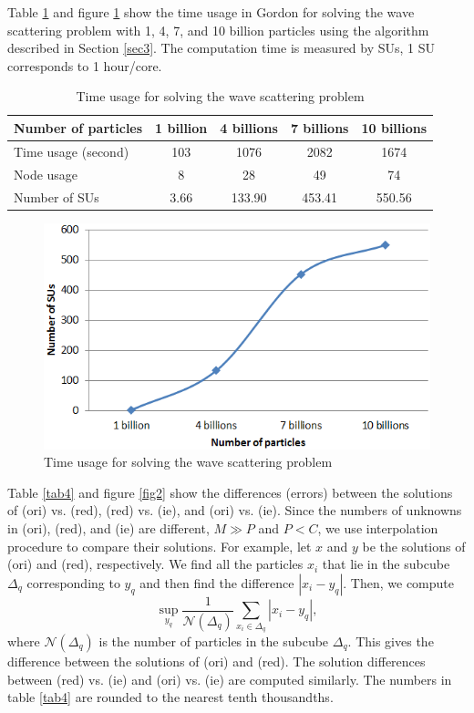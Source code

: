 \documentclass[12pt]{elsarticle}
\numberwithin{equation}{section}
\newcommand{\be}{\begin{equation}}
\newcommand{\ee}{\end{equation}}
\begin{document}
Table \ref{tab3} and figure \ref{fig1} show the time usage in Gordon for solving the wave scattering problem with 1, 4, 7, and 10 billion particles using the algorithm described in Section \ref{sec3}. The computation time is measured by SUs, 1 SU corresponds to 1 hour/core.
\begin{table}[H]
  \centering
  \caption{Time usage for solving the wave scattering problem}
    \begin{tabular}{lcccc}
    \toprule
    Number of particles & 1 billion & 4 billions & 7 billions & 10 billions \\
    \midrule
    Time usage (second) & 103   & 1076  & 2082  & 1674 \\
    Node usage & 8     & 28    & 49    & 74 \\
    Number of SUs & 3.66 & 133.90 & 453.41 & 550.56 \\
    \bottomrule
    \end{tabular}%
  \label{tab3}%
\end{table}%
\begin{figure}[htbp]
\centering
\includegraphics[width=0.8\linewidth]{SUs}
\caption{Time usage for solving the wave scattering problem}
\label{fig1}
\end{figure}
Table \ref{tab4} and figure \ref{fig2} show the differences (errors) between the solutions of (ori) vs. (red), (red) vs. (ie), and (ori) vs. (ie). Since the numbers of unknowns in (ori), (red), and (ie) are different, $M \gg P$ and $P < C$, we use interpolation procedure to compare their solutions. For example, let $x$ and $y$ be the solutions of (ori) and (red), respectively. We find all the particles $x_i$ that lie in the subcube $\Delta_q$ corresponding to $y_q$ and then find the difference $|x_i-y_q|$. Then, we compute
\be
	\sup_{y_q} \frac{1}{\mathcal{N}(\Delta_q)}\sum_{x_i \in \Delta_q}|x_i-y_q|,
\ee
where $\mathcal{N}(\Delta_q)$ is the number of particles in the subcube $\Delta_q$. This gives the difference between the solutions of (ori) and (red). The solution differences between (red) vs. (ie) and (ori) vs. (ie) are computed similarly. The numbers in table \ref{tab4} are rounded to the nearest tenth thousandths.
\end{document}
